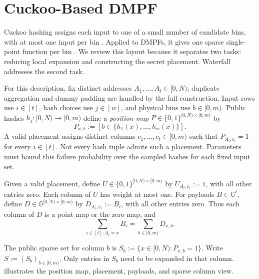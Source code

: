 
\section{Cuckoo-Based DMPF}\label{sec:cuckoo}


Cuckoo hashing assigns each input to one of a small number of candidate
bins, with at most one input per bin \cite{cuckoo}.
Applied to DMPFs, it gives one sparse single-point function per bin
\cite{fssBatchCodes,cuckooDmpf,dmpf}. We review this layout because it
separates two tasks: reducing local expansion and constructing the secret
placement. Waterfall addresses the second task.

For this description, fix distinct addresses $A_1,\ldots,A_t\in[0,N)$;
duplicate aggregation and dummy padding are handled by the full construction.
Input rows use $i\in[t]$, hash choices use $j\in[w]$, and physical bins use
$b\in[0,m)$. Public hashes $h_j:[0,N)\to[0,m)$ define a
\emph{position map} $P\in\{0,1\}^{[0,N)\times[0,m)}$ by
\[
 P_{x,b}:=[b\in\{h_1(x),\ldots,h_w(x)\}].
\]
A valid placement assigns distinct columns $c_1,\ldots,c_t\in[0,m)$
such that $P_{A_i,c_i}=1$ for every $i\in[t]$.
Not every hash tuple admits such a placement. Parameters must bound this
failure probability over the sampled hashes for each fixed input set.

Given a valid placement, define $U\in\{0,1\}^{[0,N)\times[0,m)}$ by
$U_{A_i,c_i}:=1$, with all other entries zero. Each column of $U$ has weight
at most one. For payloads $B\in\mathbb G^t$, define
$D\in\mathbb G^{[0,N)\times[0,m)}$ by $D_{A_i,c_i}:=B_i$, with all other
entries zero. Thus each column of $D$ is a point map or the zero map, and
\[
 \sum_{i\in[t]:A_i=x}B_i=\sum_{b\in[0,m)}D_{x,b}.
\]

The public sparse set for column $b$ is
$S_b:=\{x\in[0,N):P_{x,b}=1\}$. Write $S:=(S_b)_{b\in[0,m)}$.
Only entries in $S_b$ need to be expanded in that column.
 illustrates the position map, placement,
payloads, and sparse column view.
\newcommand{\vbar}{\rule{0.1mm}{.2cm}}


